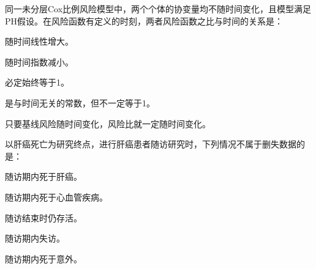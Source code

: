 \par\addvspace{8pt}\noindent\begin{minipage}{\linewidth}


同一未分层Cox比例风险模型中，两个个体的协变量均不随时间变化，且模型满足PH假设。在风险函数有定义的时刻，两者风险函数之比与时间的关系是：


\begin{choices}

\item 随时间线性增大。

\item 随时间指数减小。

\item 必定始终等于1。

\item 是与时间无关的常数，但不一定等于1。

\item 只要基线风险随时间变化，风险比就一定随时间变化。

\end{choices}

\end{minipage}\par\vspace{5pt}

\par\addvspace{8pt}\noindent\begin{minipage}{\linewidth}


以肝癌死亡为研究终点，进行肝癌患者随访研究时，下列情况不属于删失数据的是：


\begin{choices}

\item 随访期内死于肝癌。

\item 随访期内死于心血管疾病。

\item 随访结束时仍存活。

\item 随访期内失访。

\item 随访期内死于意外。

\end{choices}

\end{minipage}\par\vspace{5pt}

